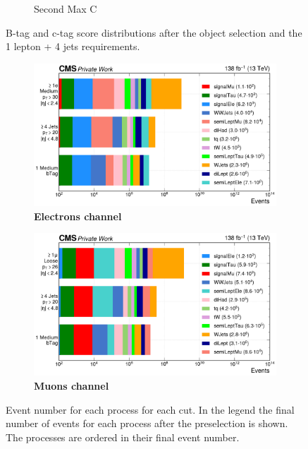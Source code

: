 \begin{figure}[H]
\begin{subfigure}{0.42\linewidth}
         \caption{Second Max \DeepJet C}
     \end{subfigure}
     \caption{B-tag and c-tag score distributions after the object selection and the 1 lepton + 4 jets requirements.}

\end{figure}
\begin{figure}[H]
     \centering
     \begin{subfigure}[t]{\linewidth}
         \centering
         \includegraphics[width=\linewidth]{fig//chap07-selection/ele_selection.png}
         \caption{\textbf{Electrons channel}}

     \end{subfigure}
     
     \vspace{1cm}
     \begin{subfigure}[b]{\linewidth}
         \centering
        \includegraphics[width=\linewidth]{fig//chap07-selection/mu_selection.png}
         \caption{\textbf{Muons channel}}
     \end{subfigure}
     \vspace{0.5cm}
        \caption{Event number for each process for each cut. In the legend the final number of events for each process after the preselection is shown. The processes are ordered in their final event number.}
        \label{fig:event_selection}
\end{figure}
\newpage
